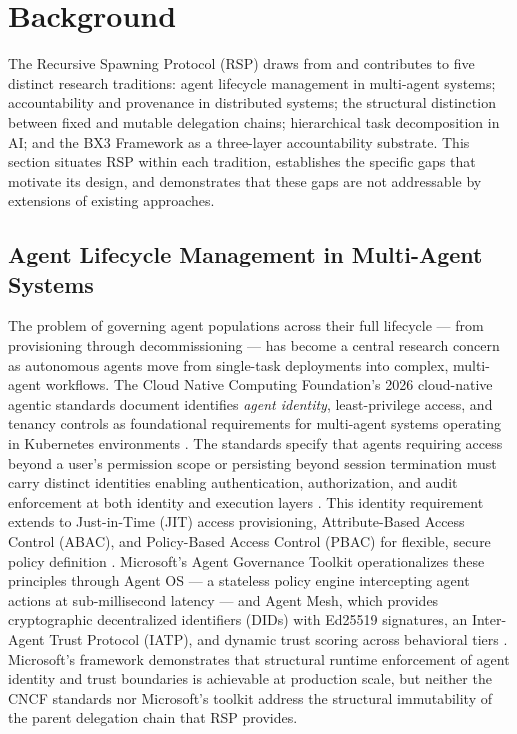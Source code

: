 \section{Background}
\label{sec:rs-background}

The Recursive Spawning Protocol (RSP) draws from and contributes to five distinct research traditions: agent lifecycle management in multi-agent systems; accountability and provenance in distributed systems; the structural distinction between fixed and mutable delegation chains; hierarchical task decomposition in AI; and the BX3 Framework as a three-layer accountability substrate. This section situates RSP within each tradition, establishes the specific gaps that motivate its design, and demonstrates that these gaps are not addressable by extensions of existing approaches.

\subsection{Agent Lifecycle Management in Multi-Agent Systems}

The problem of governing agent populations across their full lifecycle --- from provisioning through decommissioning --- has become a central research concern as autonomous agents move from single-task deployments into complex, multi-agent workflows. The Cloud Native Computing Foundation's 2026 cloud-native agentic standards document identifies \emph{agent identity}, least-privilege access, and tenancy controls as foundational requirements for multi-agent systems operating in Kubernetes environments \cite{cncf-agentic-standards}. The standards specify that agents requiring access beyond a user's permission scope or persisting beyond session termination must carry distinct identities enabling authentication, authorization, and audit enforcement at both identity and execution layers \cite{cncf-agentic-standards}. This identity requirement extends to Just-in-Time (JIT) access provisioning, Attribute-Based Access Control (ABAC), and Policy-Based Access Control (PBAC) for flexible, secure policy definition \cite{cncf-agentic-standards}. Microsoft's Agent Governance Toolkit operationalizes these principles through Agent OS --- a stateless policy engine intercepting agent actions at sub-millisecond latency --- and Agent Mesh, which provides cryptographic decentralized identifiers (DIDs) with Ed25519 signatures, an Inter-Agent Trust Protocol (IATP), and dynamic trust scoring across behavioral tiers \cite{microsoft-agent-governance}. Microsoft's framework demonstrates that structural runtime enforcement of agent identity and trust boundaries is achievable at production scale, but neither the CNCF standards nor Microsoft's toolkit address the structural immutability of the parent delegation chain that RSP provides.

